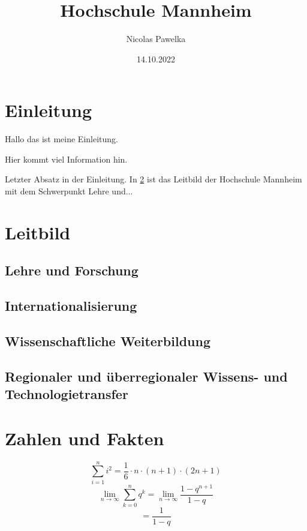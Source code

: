 \documentclass[11pt,a4paper]{article}
\title{Hochschule Mannheim}
\author{Nicolas Pawelka}
\date{14.10.2022}
\begin{document}
\maketitle

\begin{abstract}

\end{abstract}
\tableofcontents

\section{Einleitung}
Hallo das ist meine Einleitung.

Hier kommt viel Information hin.

Letzter Absatz in der Einleitung. In \ref{sec:Leitbild} ist das Leitbild der Hochschule Mannheim mit dem Schwerpunkt Lehre und...
\section{Leitbild}\label{sec:Leitbild}
\Blindtext[1]

\subsection{Lehre und Forschung}
\Blindtext[2]
\subsection{Internationalisierung}
\Blindtext[2]
\subsection{Wissenschaftliche Weiterbildung}
\Blindtext[2]
\subsection{Regionaler und überregionaler Wissens- und Technologietransfer}
\Blindtext[2]

\section{Zahlen und Fakten}

\begin{equation}
 \sum_{i=1}^n i^2 = \frac{1}{6} \cdot n \cdot (n+1) \cdot (2n+1)
\end{equation}
\begin{equation}\label{eq:1}
\lim_{n \to \infty} \sum_{k=0}^n q^k = \lim_{n \to \infty} \frac{1 - q^{n+1}}{1-q}
\end{equation}
\begin{equation}\label{eq:2}
 = \frac{1}{1-q}
\end{equation}
\end{document}
